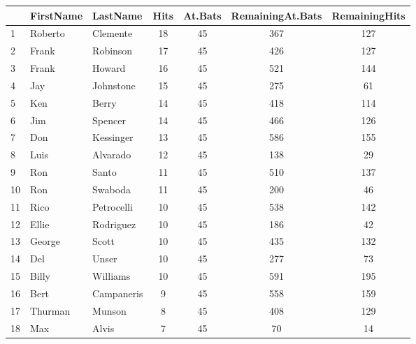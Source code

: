 \begin{table}[H]
\begin{tabular}{lllcccc}
 &  FirstName &  LastName & Hits & At.Bats & RemainingAt.Bats & RemainingHits\\
 \hline
1    & Roberto &   Clemente &   18 &      45 &              367 &           127\\
2    &  Frank  & Robinson &  17    &  45            &  426         &  127\\
3    &  Frank  &   Howard  & 16    &  45             & 521         &  144\\
4    &    Jay & Johnstone  & 15    &  45             & 275         &   61\\
5    &    Ken  &    Berry  & 14    &  45            &  418          & 114\\
6    &    Jim  &  Spencer  & 14    &  45            &  466          & 126\\
7    &    Don & Kessinger  & 13    &  45             & 586          & 155\\
8    &   Luis &  Alvarado  & 12    &  45              & 138          &  29\\
9    &    Ron   &   Santo  & 11    &  45             & 510          & 137\\
10   &    Ron  &  Swaboda  & 11    &  45             & 200          &  46\\
11   &   Rico & Petrocelli  & 10    &  45             & 538          & 142\\
12   &  Ellie  & Rodriguez  & 10    &  45             & 186          &  42\\
13   & George    &  Scott  & 10    &  45             & 435          & 132\\
14   &    Del   &   Unser  & 10    &  45             & 277          &  73\\
15   &  Billy  & Williams  & 10    &  45             & 591          & 195\\
16   &   Bert & Campaneris   & 9    &  45             & 558          & 159\\
17   & Thurman   &  Munson   & 8    &  45             & 408          & 129\\
18     &  Max   &   Alvis   & 7   &   45              & 70           & 14 \\
\hline
\end{tabular}
\end{table}

